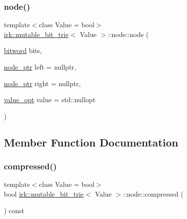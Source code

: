 \mbox{\label{structirk_1_1mutable__bit__trie_1_1node_a8b89d07cbc5be62f39eb3995659812b2}} 
\subsubsection{\texorpdfstring{node()}{node()}\hspace{0.1cm}{\footnotesize\ttfamily [2/2]}}
{\footnotesize\ttfamily template$<$class Value = bool$>$ \\
\mbox{\hyperlink{classirk_1_1mutable__bit__trie}{irk\+::mutable\+\_\+bit\+\_\+trie}}$<$ Value $>$\+::node\+::node (\begin{DoxyParamCaption}\item[{\mbox{\hyperlink{namespaceirk_a5d1a67079cf6423ecaededebe848f083}{bitword}}}]{bits,  }\item[{\mbox{\hyperlink{classirk_1_1mutable__bit__trie_abd23179ac4f02a981d4f47b4c0652287}{node\+\_\+ptr}}}]{left = {\ttfamily nullptr},  }\item[{\mbox{\hyperlink{classirk_1_1mutable__bit__trie_abd23179ac4f02a981d4f47b4c0652287}{node\+\_\+ptr}}}]{right = {\ttfamily nullptr},  }\item[{\mbox{\hyperlink{classirk_1_1mutable__bit__trie_a7a1b77766d10fe2d02bb2ce01983f153}{value\+\_\+opt}}}]{value = {\ttfamily std\+:\+:nullopt} }\end{DoxyParamCaption})\hspace{0.3cm}{\ttfamily [inline]}}



\subsection{Member Function Documentation}
\mbox{\label{structirk_1_1mutable__bit__trie_1_1node_a3b28e6bf24b4500b5b9fd7d3c1bb48e0}} 
\subsubsection{\texorpdfstring{compressed()}{compressed()}}
{\footnotesize\ttfamily template$<$class Value = bool$>$ \\
bool \mbox{\hyperlink{classirk_1_1mutable__bit__trie}{irk\+::mutable\+\_\+bit\+\_\+trie}}$<$ Value $>$\+::node\+::compressed (\begin{DoxyParamCaption}{ }\end{DoxyParamCaption}) const\hspace{0.3cm}{\ttfamily [inline]}}



